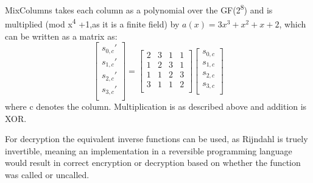 \documentclass[a4paper]{article}
\begin{document}
\begin{enumerate}
MixColumns takes each column as a polynomial over the GF(2\textsuperscript{8}) and is multiplied (mod x\textsuperscript{4} +1,as it is a finite field) by \(a(x) = 3x^3 + x^2 + x + 2\), which can be written as a matrix as:
\[
\begin{bmatrix}
 s_{0,c}' \\
 s_{1,c}' \\
 s_{2,c}' \\
 s_{3,c}' \\
\end{bmatrix}=
\begin{bmatrix}
 2 & 3 & 1 & 1 \\
 1 & 2 & 3 & 1 \\
 1 & 1 & 2 & 3 \\
 3 & 1 & 1 & 2 \\
\end{bmatrix}
\begin{bmatrix}
 s_{0,c} \\
 s_{1,c} \\
 s_{2,c} \\
 s_{3,c} \\
\end{bmatrix}
\]
where c denotes the column. Multiplication is as described above and addition is XOR.

For decryption the equivalent inverse functions can be used, as Rijndahl is truely invertible, meaning an implementation in a reversible programming language would result in correct encryption or decryption based on whether the function was called or uncalled.


\end{enumerate}
\end{document}
